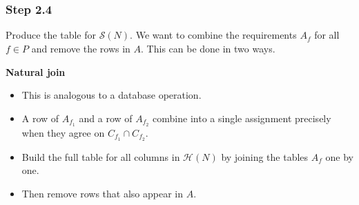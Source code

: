 \documentclass{beamer}
\newcommand{\HH}{\mathcal H}
\begin{document}
\begin{frame}
  \frametitle{Step 2.4}
  Produce the table for $\widehat{\mathcal S}(N)$. We want to combine
  the requirements $A_f$ for all $f\in P$ and remove the rows in $A$.
  This can be done in two ways.

  \medskip
  \textbf{Natural join}
  \begin{itemize}
    \item This is analogous to a database operation.
    \item A row of $A_{f_1}$ and a row of $A_{f_2}$ combine into a
      single assignment precisely when they agree on
      $C_{f_1}\cap C_{f_2}$.
    \item Build the full table for all columns in $\HH(N)$ by joining
      the tables $A_f$ one by one.
    \item Then remove rows that also appear in $A$.
  \end{itemize}
\end{frame}
\end{document}
